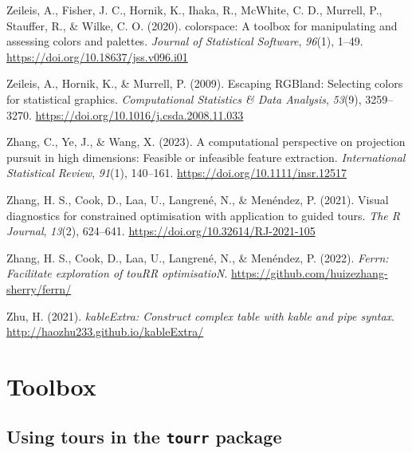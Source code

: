 \documentclass[
  letterpaper,
]{krantz}
\newlength{\cslhangindent}
\newenvironment{CSLReferences}[2] %
 {\begin{list}{}{%
  \setlength{\itemindent}{0pt}
  \setlength{\leftmargin}{0pt}
  \setlength{\parsep}{0pt}
  \ifodd #1
   \setlength{\leftmargin}{\cslhangindent}
   \setlength{\itemindent}{-1\cslhangindent}
  \fi
  \setlength{\itemsep}{#2\baselineskip}}}
 {\end{list}}
\begin{document}
\begin{CSLReferences}{1}{0}
Zeileis, A., Fisher, J. C., Hornik, K., Ihaka, R., McWhite, C. D.,
Murrell, P., Stauffer, R., \& Wilke, C. O. (2020). {colorspace}: A
toolbox for manipulating and assessing colors and palettes.
\emph{Journal of Statistical Software}, \emph{96}(1), 1--49.
\url{https://doi.org/10.18637/jss.v096.i01}

Zeileis, A., Hornik, K., \& Murrell, P. (2009). Escaping {RGB}land:
Selecting colors for statistical graphics. \emph{Computational
Statistics \& Data Analysis}, \emph{53}(9), 3259--3270.
\url{https://doi.org/10.1016/j.csda.2008.11.033}

Zhang, C., Ye, J., \& Wang, X. (2023). A computational perspective on
projection pursuit in high dimensions: Feasible or infeasible feature
extraction. \emph{International Statistical Review}, \emph{91}(1),
140--161. \url{https://doi.org/10.1111/insr.12517}

Zhang, H. S., Cook, D., Laa, U., Langrené, N., \& Menéndez, P. (2021).
Visual diagnostics for constrained optimisation with application to
guided tours. \emph{The R Journal}, \emph{13}(2), 624--641.
\url{https://doi.org/10.32614/RJ-2021-105}

Zhang, H. S., Cook, D., Laa, U., Langrené, N., \& Menéndez, P. (2022).
\emph{Ferrn: Facilitate exploration of touRR optimisatioN}.
\url{https://github.com/huizezhang-sherry/ferrn/}

Zhu, H. (2021). \emph{kableExtra: Construct complex table with kable and
pipe syntax}. \url{http://haozhu233.github.io/kableExtra/}

\end{CSLReferences}

\cleardoublepage
{}
{}
\appendix

\chapter{Toolbox}\label{toolbox}

\section{\texorpdfstring{Using tours in the \texttt{tourr}
package}{Using tours in the tourr package}}\label{using-tours-in-the-tourr-package}
\end{document}
